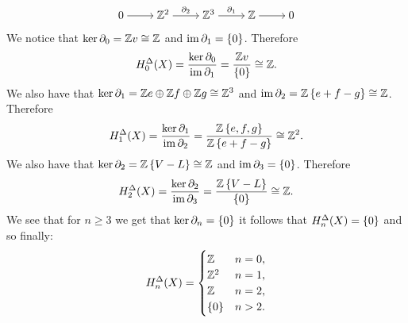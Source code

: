 \documentclass[11pt,a4paper]{article}
\begin{document}
\begin{solution}
  \[\begin{tikzcd}[ampersand replacement=\&,cramped]
    0 \& \Z^2 \& {\Z^3} \& {\Z} \& 0
    \arrow[from=1-1, to=1-2]
    \arrow["{\partial_2}", from=1-2, to=1-3]
    \arrow["{\partial_1}", from=1-3, to=1-4]
    \arrow[from=1-4, to=1-5]
  \end{tikzcd}\]
  We notice that $\ker \partial_0 = \mathbb{Z} v \cong \mathbb{Z}$
  and $\operatorname{im} \partial_1 = \left\{0\right\}$.
  Therefore
  \[
    H_0^{\Delta}(X) =
    \frac{\ker \partial_0}{\operatorname{im} \partial_1} =
    \frac{\mathbb{Z} v}{\left\{0\right\}} \cong \mathbb{Z}.
  \]
  We also have that $\ker \partial_1 = \mathbb{Z} e \oplus \mathbb{Z} f \oplus \mathbb{Z} g \cong \mathbb{Z}^3$
  and $\operatorname{im} \partial_2 = \mathbb{Z}\left\{e + f - g\right\} \cong \mathbb{Z}$. Therefore
  \[
    H_1^{\Delta}(X) =
    \frac{\ker \partial_1}{\operatorname{im} \partial_2} =
    \frac{\mathbb{Z}\left\{e,f,g\right\}}{\mathbb{Z}\left\{e + f - g\right\}} \cong \mathbb{Z}^2.
  \]
  We also have that $\ker \partial_2 = \mathbb{Z}\left\{V - L\right\} \cong \mathbb{Z}$ and
  $\operatorname{im} \partial_3 = \left\{0\right\}$. Therefore
  \[
    H_2^{\Delta}(X) =
    \frac{\ker \partial_2}{\operatorname{im} \partial_3} =
    \frac{\mathbb{Z}\left\{V - L\right\}}{\left\{0\right\}} \cong \mathbb{Z}.
  \]
  We see that for $n \geq 3$ we get that $\ker \partial_n = \left\{0\right\}$ it follows
  that $H_n^{\Delta}(X) = \left\{0\right\}$ and so finally:
  \[
    H^{\Delta}_n(X) =
    \begin{cases}
      \mathbb{Z} &n = 0, \\
      \mathbb{Z}^2 &n = 1, \\
      \mathbb{Z} &n = 2, \\
      \left\{0\right\} &n > 2.
    \end{cases}
  \]
\end{solution}
\end{document}
